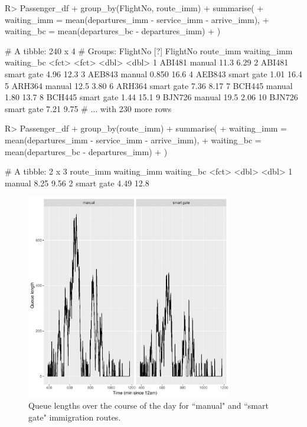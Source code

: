 \documentclass[article]{jss}
\begin{document}
\begin{CodeChunk}
\begin{Sinput}
R> Passenger_df %
+    group_by(FlightNo, route_imm) %
+    summarise(
+      waiting_imm = mean(departures_imm - service_imm - arrive_imm), 
+      waiting_bc = mean(departures_bc - departures_imm)
+    )
\end{Sinput}
\begin{Soutput}
# A tibble: 240 x 4
# Groups:   FlightNo [?]
   FlightNo route_imm  waiting_imm waiting_bc
   <fct>    <fct>            <dbl>      <dbl>
 1 ABI481   manual          11.3         6.29
 2 ABI481   smart gate       4.96       12.3 
 3 AEB843   manual           0.850      16.6 
 4 AEB843   smart gate       1.01       16.4 
 5 ARH364   manual          12.5         3.80
 6 ARH364   smart gate       7.36        8.17
 7 BCH445   manual           1.80       13.7 
 8 BCH445   smart gate       1.44       15.1 
 9 BJN726   manual          19.5         2.06
10 BJN726   smart gate       7.21        9.75
# ... with 230 more rows
\end{Soutput}
\begin{Sinput}
R> Passenger_df %
+    group_by(route_imm) %
+    summarise(
+      waiting_imm = mean(departures_imm - service_imm - arrive_imm), 
+      waiting_bc = mean(departures_bc - departures_imm)
+    )
\end{Sinput}
\begin{Soutput}
# A tibble: 2 x 3
  route_imm  waiting_imm waiting_bc
  <fct>            <dbl>      <dbl>
1 manual            8.25       9.56
2 smart gate        4.49      12.8
\end{Soutput}
\end{CodeChunk}

\begin{figure}[!htb]
\centering
\includegraphics[width = 0.8\textwidth]{figures/queuelength_dplyr.pdf}
\caption{Queue lengths over the course of the day for ``manual" and ``smart gate" immigration routes. }
\label{fig:queuelength_dplyr}
\end{figure}
\end{document}
